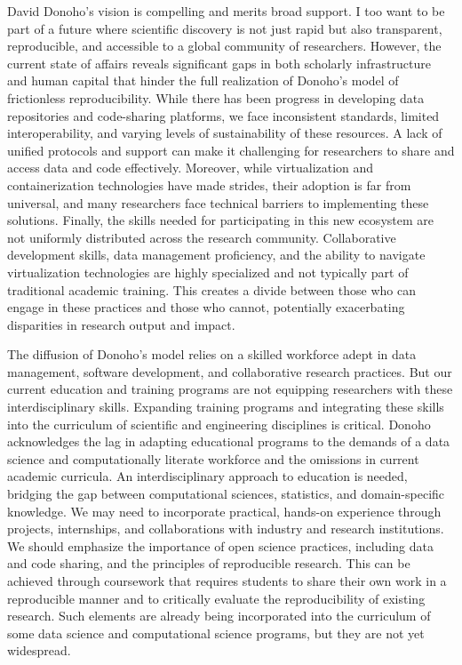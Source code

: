 \documentclass[]{hdsr}
\begin{document}
David Donoho's vision is compelling and merits broad support. I too want to be part of a future where scientific discovery is not just rapid but also transparent, reproducible, and accessible to a global community of researchers. However, the current state of affairs reveals significant gaps in both scholarly infrastructure and human capital that hinder the full realization of Donoho's model of frictionless reproducibility. While there has been progress in developing data repositories and code-sharing platforms, we face inconsistent standards, limited interoperability, and varying levels of sustainability of these resources. A lack of unified protocols and support can make it challenging for researchers to share and access data and code effectively. Moreover, while virtualization and containerization technologies have made strides, their adoption is far from universal, and many researchers face technical barriers to implementing these solutions. Finally, the skills needed for participating in this new ecosystem are not uniformly distributed across the research community. Collaborative development skills, data management proficiency, and the ability to navigate virtualization technologies are highly specialized and not typically part of traditional academic training. This creates a divide between those who can engage in these practices and those who cannot, potentially exacerbating disparities in research output and impact.

The diffusion of Donoho's model relies on a skilled workforce adept in data management, software development, and collaborative research practices. But our current education and training programs are not equipping researchers with these interdisciplinary skills. Expanding training programs and integrating these skills into the curriculum of scientific and engineering disciplines is critical.
Donoho acknowledges the lag in adapting educational programs to the demands of a data science and computationally literate workforce and the omissions in current academic curricula. An interdisciplinary approach to education is needed, bridging the gap between computational sciences, statistics, and domain-specific knowledge. We may need to incorporate practical, hands-on experience through projects, internships, and collaborations with industry and research institutions. We should emphasize the importance of open science practices, including data and code sharing, and the principles of reproducible research. This can be achieved through coursework that requires students to share their own work in a reproducible manner and to critically evaluate the reproducibility of existing research. Such elements are already being incorporated into the curriculum of some data science and computational science programs, but they are not yet widespread.
\end{document}
